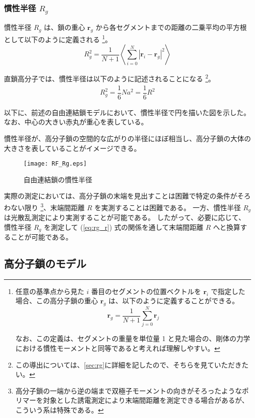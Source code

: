 \documentclass[a4paper,11pt]{ltjsarticle}
\begin{document}
\subsubsection{慣性半径 $R_g$}

慣性半径 $R_g$ は、鎖の重心 $\bm{r}_g$ から各セグメントまでの距離の二乗平均の平方根として以下のように定義される
\footnote
{
任意の基準点から見た $i$ 番目のセグメントの位置ベクトルを $\bm{r}_i$ で指定した場合、この高分子鎖の重心 $\bm{r}_g$ は、以下のように定義することができる。
\begin{equation*}
\bm{r}_g = \dfrac{1}{N+1} \sum_{j=0}^{N} \bm{r}_j
\end{equation*}

なお、この定義は、セグメントの重量を単位量 1 と見た場合の、剛体の力学における慣性モーメントと同等であると考えれば理解しやすい。
}。
\begin{equation*}
R_g^2 = \dfrac{1}{N+1} \left\langle \sum_{i=0}^{N} |\bm{r}_i - \bm{r}_g|^2 \right\rangle
\end{equation*}

直鎖高分子では、慣性半径は以下のように記述されることになる
\footnote
{
この導出については、\ref{sec:rg}に詳細を記したので、そちらを見ていただきたい。
}。
\begin{align}
R_g^2 = \dfrac{1}{6}Na^2 = \dfrac{1}{6} R^2
\label{eq:rg_r}
\end{align}

以下に、前述の自由連結鎖モデルにおいて、慣性半径で円を描いた図を示した。
なお、中心の大きい赤丸が重心を表している。

慣性半径が、高分子鎖の空間的な広がりの半径にほぼ相当し、高分子鎖の大体の大きさを表していることがイメージできる。
\begin{figure}[htb]
 \centering
	\texttt{[image: RF\_Rg.eps]}
	\caption{自由連結鎖の慣性半径}
	\label{fig: RF_Rg}
\end{figure}

実際の測定においては、高分子鎖の末端を見出すことは困難で特定の条件がそろわない限り
\footnote
{
高分子鎖の一端から逆の端まで双極子モーメントの向きがそろったようなポリマーを対象とした誘電測定により末端間距離を測定できる場合があるが、こういう系は特殊である。
}、末端間距離 $R$ を実測することは困難である。
一方、慣性半径 $R_g$ は光散乱測定により実測することが可能である。
したがって、必要に応じて、慣性半径 $R_g$ を測定して (\ref{eq:rg_r}) 式の関係を通して末端間距離 $R$ へと換算することが可能である。

\subsection{高分子鎖のモデル}
\end{document}
